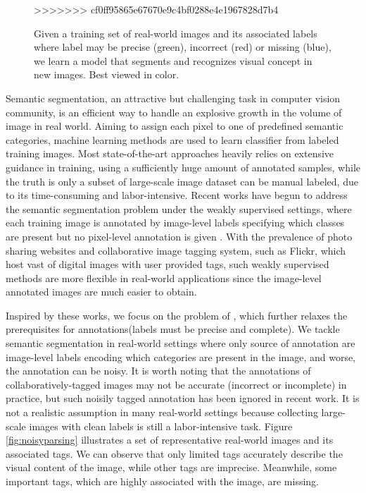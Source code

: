 \begin{figure}[t]
\begin{center}
\end{center}
    \caption{Given a training set of real-world images and its associated labels where label may be precise (green), incorrect (red) or missing (blue), we learn a model that segments and recognizes visual concept in new images. Best viewed in color.}
\label{fig:noisylabel}
>>>>>>> cf0ff95865e67670e9c4bf0288e4e1967828d7b4
\end{figure}

Semantic segmentation, an attractive but challenging task in computer vision community, is an efficient way to handle an explosive growth in the volume of image in real world. Aiming to assign each pixel to one of predefined semantic categories, machine learning methods are used to learn classifier from labeled training images. Most state-of-the-art approaches heavily relies on extensive guidance in training, using a sufficiently huge amount of annotated samples, while the truth is only a subset of large-scale image dataset can be manual labeled, due to its time-consuming and labor-intensive. Recent works have begun to address the semantic segmentation problem under the weakly supervised settings, where each training image is annotated by image-level labels specifying which classes are present but no pixel-level annotation is given \cite{verbeek2007region,vezhnevets2010towards,vezhnevets2011weakly,vezhnevets2012weakly,xu2014tell,zhang2013sparse,zhang2013probabilistic}. With the prevalence of photo sharing websites and collaborative image tagging system, such as Flickr, which host vast of digital images with user provided tags, such weakly supervised methods are more flexible in real-world applications since the image-level annotated images are much easier to obtain.

Inspired by these works, we focus on the problem of , which further relaxes the prerequisites for annotations(\eg labels must be precise and complete). We tackle semantic segmentation in real-world settings where only source of annotation are image-level labels encoding which categories are present in the image, and worse, the annotation can be noisy. It is worth noting that the annotations of collaboratively-tagged images may not be accurate (incorrect or incomplete) in practice, but such noisily tagged annotation has been ignored in recent work. It is not a realistic assumption in many real-world settings because collecting large-scale images with clean labels is still a labor-intensive task. Figure \ref{fig:noisyparsing} illustrates a set of representative real-world images and its associated tags. We can observe that only limited tags accurately describe the visual content of the image, while other tags are imprecise. Meanwhile, some important tags, which are highly associated with the image, are missing.

